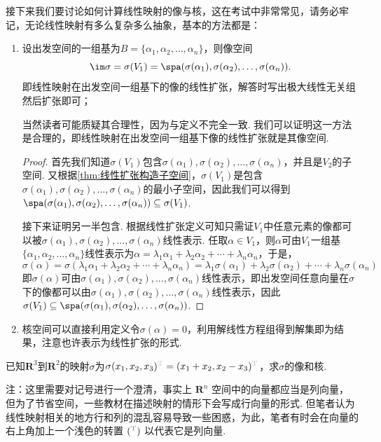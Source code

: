接下来我们要讨论如何计算线性映射的像与核，这在考试中非常常见，请务必牢记，无论线性映射有多么复杂多么抽象，基本的方法都是：
\begin{enumerate}
    \item 设出发空间的一组基为$B=\{\alpha_1,\alpha_2,\ldots,\alpha_n\}$，则像空间
          \[\im \sigma=\sigma(V_1)=\spa(\sigma(\alpha_1),\sigma(\alpha_2),\ldots,\sigma(\alpha_n)).\]
          即线性映射在出发空间一组基下的像的线性扩张，解答时写出极大线性无关组然后扩张即可；

          当然读者可能质疑其合理性，因为与定义不完全一致. 我们可以证明这一方法是合理的，即线性映射在出发空间一组基下像的线性扩张就是其像空间.

          \begin{proof}
              首先我们知道$\sigma(V_1)$包含$\sigma(\alpha_1),\sigma(\alpha_2),\ldots,\sigma(\alpha_n)$，并且是$V_2$的子空间. 又根据\autoref{thm:线性扩张构造子空间}，$\sigma(V_1)$是包含$\sigma(\alpha_1),\sigma(\alpha_2),\ldots,\sigma(\alpha_n)$的最小子空间，因此我们可以得到$\spa(\sigma(\alpha_1),\sigma(\alpha_2),\ldots,\sigma(\alpha_n))\subseteq\sigma(V_1)$.

              接下来证明另一半包含. 根据线性扩张定义可知只需证$V_1$中任意元素的像都可以被$\sigma(\alpha_1),\sigma(\alpha_2),\ldots,\sigma(\alpha_n)$线性表示. 任取$\alpha\in V_1$，则$\alpha$可由$V_1$一组基$\{\alpha_1,\alpha_2,\ldots,\alpha_n\}$线性表示为$\alpha=\lambda_1\alpha_1+\lambda_2\alpha_2+\cdots+\lambda_n\alpha_n$，于是，
              \[\sigma(\alpha)=\sigma(\lambda_1\alpha_1+\lambda_2\alpha_2+\cdots+\lambda_n\alpha_n)=\lambda_1\sigma(\alpha_1)+\lambda_2\sigma(\alpha_2)+\cdots+\lambda_n\sigma(\alpha_n)\]
              即$\sigma(\alpha)$可由$\sigma(\alpha_1),\sigma(\alpha_2),\ldots,\sigma(\alpha_n)$线性表示，即出发空间任意向量在$\sigma$下的像都可以由$\sigma(\alpha_1),\sigma(\alpha_2),\ldots,\sigma(\alpha_n)$线性表示，因此$\sigma(V_1)\subseteq\spa(\sigma(\alpha_1),\sigma(\alpha_2),\ldots,\sigma(\alpha_n))$.
          \end{proof}

    \item 核空间可以直接利用定义令$\sigma(\alpha)=0$，利用解线性方程组得到解集即为结果，注意也许表示为线性扩张的形式.
\end{enumerate}

\begin{example}{}{}
    已知$\mathbf{R}^3$到$\mathbf{R}^2$的映射$\sigma$为$\sigma(x_1,x_2,x_3)^{\color{lightgray}\mathrm{T}}=(x_1+x_2,x_2-x_3)^{\color{lightgray}\mathrm{T}}$，求$\sigma$的像和核.
\end{example}
注：这里需要对记号进行一个澄清，事实上 $\mathbf{R}^n$ 空间中的向量都应当是列向量，但为了节省空间，一些教材在描述映射的情形下会写成行向量的形式. 但笔者认为线性映射相关的地方行和列的混乱容易导致一些困惑，为此，笔者有时会在向量的右上角加上一个浅色的转置 $({}^{\color{gray}\mathrm{T}})$ 以代表它是列向量.

